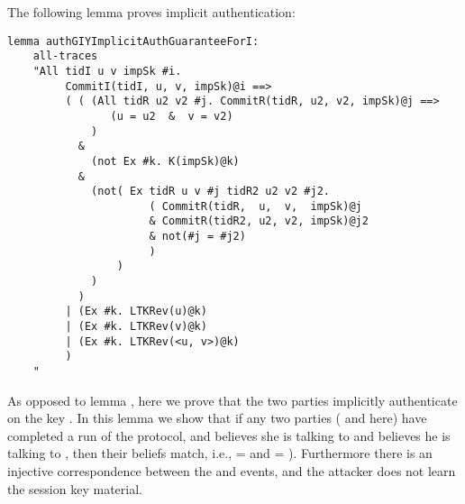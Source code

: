 The following lemma proves implicit authentication:

\begin{lstlisting}
lemma authGIYImplicitAuthGuaranteeForI:
    all-traces
    "All tidI u v impSk #i.
         CommitI(tidI, u, v, impSk)@i ==>
         ( ( (All tidR u2 v2 #j. CommitR(tidR, u2, v2, impSk)@j ==>
                (u = u2  &  v = v2)
             )
           &
             (not Ex #k. K(impSk)@k)
           &
             (not( Ex tidR u v #j tidR2 u2 v2 #j2.
                      ( CommitR(tidR,  u,  v,  impSk)@j
                      & CommitR(tidR2, u2, v2, impSk)@j2
                      & not(#j = #j2)
                      )
                 )
             )
           )
         | (Ex #k. LTKRev(u)@k)
         | (Ex #k. LTKRev(v)@k)
         | (Ex #k. LTKRev(<u, v>)@k)
         )
    "
\end{lstlisting}
As opposed to lemma , here we prove that the two
parties implicitly authenticate on the key .
%
In this lemma we show that if any two parties ( and  here) 
have completed a run of the protocol, and  believes she is talking to
  and  believes he is talking to , then their beliefs
match, i.e.,  =  and  = ).
%
Furthermore there is an injective correspondence
between the  and  events, and the attacker does not
learn the session key material.
%
\\

